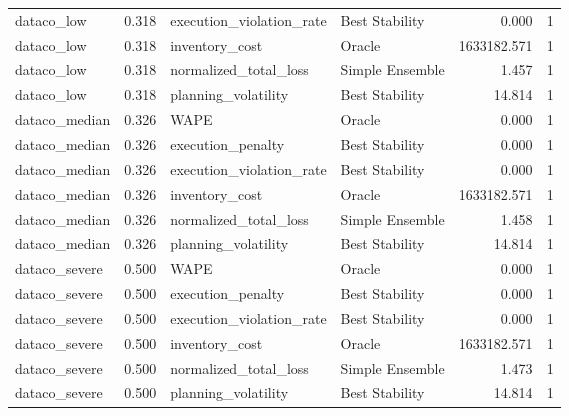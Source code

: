 \begin{table}
{\begin{tabular}{lrllrr}
    dataco\_low &             0.318 &  execution\_violation\_rate &   Best Stability &         0.000 &               1 \\
    dataco\_low &             0.318 &            inventory\_cost &           Oracle &   1633182.571 &               1 \\
    dataco\_low &             0.318 &     normalized\_total\_loss &  Simple Ensemble &         1.457 &               1 \\
    dataco\_low &             0.318 &       planning\_volatility &   Best Stability &        14.814 &               1 \\
 dataco\_median &             0.326 &                      WAPE &           Oracle &         0.000 &               1 \\
 dataco\_median &             0.326 &         execution\_penalty &   Best Stability &         0.000 &               1 \\
 dataco\_median &             0.326 &  execution\_violation\_rate &   Best Stability &         0.000 &               1 \\
 dataco\_median &             0.326 &            inventory\_cost &           Oracle &   1633182.571 &               1 \\
 dataco\_median &             0.326 &     normalized\_total\_loss &  Simple Ensemble &         1.458 &               1 \\
 dataco\_median &             0.326 &       planning\_volatility &   Best Stability &        14.814 &               1 \\
 dataco\_severe &             0.500 &                      WAPE &           Oracle &         0.000 &               1 \\
 dataco\_severe &             0.500 &         execution\_penalty &   Best Stability &         0.000 &               1 \\
 dataco\_severe &             0.500 &  execution\_violation\_rate &   Best Stability &         0.000 &               1 \\
 dataco\_severe &             0.500 &            inventory\_cost &           Oracle &   1633182.571 &               1 \\
 dataco\_severe &             0.500 &     normalized\_total\_loss &  Simple Ensemble &         1.473 &               1 \\
 dataco\_severe &             0.500 &       planning\_volatility &   Best Stability &        14.814 &               1 \\
\bottomrule
\end{tabular}
}

\end{table}
